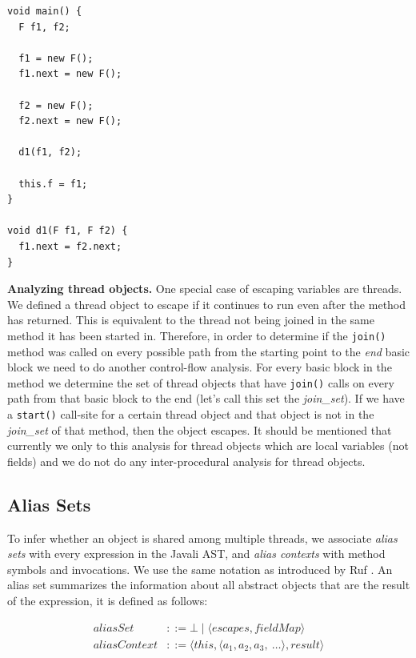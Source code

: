\documentclass[letterpaper]{article}
\newcommand{\mypar}[1]{{\bf #1.}}
\begin{document}
\begin{lstlisting}[caption=Field parameter assignment, label=lst:fields]
void main() {
  F f1, f2;

  f1 = new F();
  f1.next = new F();

  f2 = new F();
  f2.next = new F();

  d1(f1, f2);

  this.f = f1;
}

void d1(F f1, F f2) {
  f1.next = f2.next;
}
\end{lstlisting}

\mypar{Analyzing thread objects} One special case of escaping variables are threads. We defined a thread object to escape if
it continues to run even after the method has returned. This is equivalent to the thread not being joined in the same method it has
been started in.
Therefore, in order to determine if the \texttt{join()} method was called on every possible path from the starting point
to the \textit{end} basic block we need to do another control-flow analysis. For every basic block in the method we 
determine the set of thread objects that have \texttt{join()} calls on every path from that basic block to the end (let's call this set the \textit{join\_set}).
If we have a \texttt{start()} call-site for a certain thread object and that object is not in the \textit{join\_set} of that
method, then the object escapes.
It should be mentioned that currently we only to this analysis for thread objects which are local variables (not fields) and we do not do any inter-procedural analysis for thread objects.

\subsection{Alias Sets}

To infer whether an object is shared among multiple threads, we associate \emph{alias sets}
with every expression in the Javali AST, and \emph{alias contexts} with method symbols and invocations.
We use the same notation as introduced by Ruf \cite{Ruf:00}.
An alias set summarizes the information about all abstract objects that are the result of the expression, it is defined as follows:

\begin{equation*}
\begin{split}
    aliasSet &::= \bot \mid \langle escapes, fieldMap \rangle \\
    aliasContext &::= \langle this, \langle a_{1}, a_{2}, a_{3},~\dots \rangle, result \rangle
\end{split}
\end{equation*}
\end{document}
